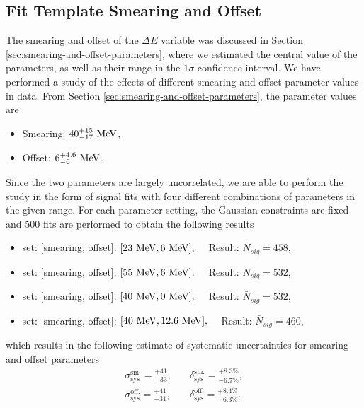\subsection{Fit Template Smearing and Offset}
The smearing and offset of the $\Delta E$ variable was discussed in Section \ref{sec:smearing-and-offset-parameters}, where we estimated the central value of the parameters, as well as their range in the $1\sigma$ confidence interval. We have performed a study of the effects of different smearing and offset parameter values in data. From Section \ref{sec:smearing-and-offset-parameters}, the parameter values are
\begin{itemize}
	\item Smearing: $40_{-17}^{+15}\mathrm{~MeV}$,
	\item Offset: $6_{-6}^{+4.6}\mathrm{~MeV}$.
\end{itemize}
Since the two parameters are largely uncorrelated, we are able to perform the study in the form of signal fits with four different combinations of parameters in the given range. For each parameter setting, the Gaussian constraints are fixed and 500 fits are performed to obtain the following results
\begin{itemize}
	\item set: [smearing, offset]: $[23\mathrm{~MeV},6\mathrm{~MeV}],\quad$ Result: $ \bar N {}_{sig} = 458 $,
	\item set: [smearing, offset]: $[55\mathrm{~MeV},6\mathrm{~MeV}],\quad$ Result: $ \bar N {}_{sig} = 532 $,
	\item set: [smearing, offset]: $[40\mathrm{~MeV},0\mathrm{~MeV}],\quad$ Result: $ \bar N {}_{sig} = 532 $,
	\item set: [smearing, offset]: $[40\mathrm{~MeV},12.6\mathrm{~MeV}],\quad$ Result: $ \bar N {}_{sig} = 460 $,
\end{itemize}
which results in the following estimate of systematic uncertainties for smearing and offset parameters
\begin{align}
\sigma_{\mathrm{sys}}^{\mathrm{sm.}} = {}^{+41}_{-33},&\quad \delta_{\mathrm{sys}}^{\mathrm{sm.}} = {}^{+8.3\%}_{-6.7\%}, \\
\sigma_{\mathrm{sys}}^{\mathrm{off.}} = {}^{+41}_{-31},&\quad \delta_{\mathrm{sys}}^{\mathrm{off.}} = {}^{+8.4\%}_{-6.3\%}.
\end{align}

